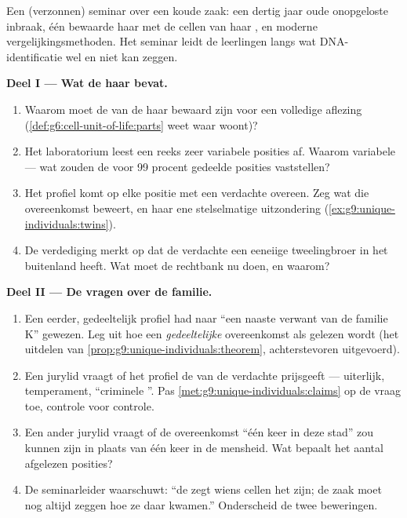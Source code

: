 \begin{problem}\label{pb:g9:unique-individuals:1}
Een (verzonnen) seminar over een koude zaak: een dertig jaar oude
onopgeloste inbraak, één bewaarde haar met de cellen van haar
, en moderne vergelijkingsmethoden. Het seminar leidt de
leerlingen langs wat DNA-identificatie wel en niet kan zeggen.

\medskip\noindent\textbf{Deel I --- Wat de haar
bevat.}
\begin{enumerate}
  \item Waarom moet de \emph{} van de haar bewaard zijn
        voor een volledige aflezing
        (\cref{def:g6:cell-unit-of-life:parts} weet waar 
        woont)?
  \item Het laboratorium leest een reeks zeer variabele posities
        af. Waarom variabele --- wat zouden de voor 99 procent
        gedeelde posities vaststellen?
  \item Het profiel komt op elke positie met een verdachte
        overeen. Zeg wat die overeenkomst beweert, en haar ene
        stelselmatige uitzondering
        (\cref{ex:g9:unique-individuals:twins}).
  \item De verdediging merkt op dat de verdachte een eeneiige
        tweelingbroer in het buitenland heeft. Wat moet de
        rechtbank nu doen, en waarom?
\end{enumerate}

\medskip\noindent\textbf{Deel II --- De vragen over de
familie.}
\begin{enumerate}[resume]
  \item Een eerder, gedeeltelijk profiel had naar ``een naaste
        verwant van de familie K'' gewezen. Leg uit hoe een
        \emph{gedeeltelijke} overeenkomst als 
        gelezen wordt (het uitdelen van
        \cref{prop:g9:unique-individuals:theorem}, achterstevoren
        uitgevoerd).
  \item Een jurylid vraagt of het profiel de  van de
        verdachte prijsgeeft --- uiterlijk, temperament,
        ``criminele ''. Pas
        \cref{met:g9:unique-individuals:claims} op de vraag toe,
        controle voor controle.
  \item Een ander jurylid vraagt of de overeenkomst ``één keer in
        deze stad'' zou kunnen zijn in plaats van één keer in de
        mensheid. Wat bepaalt het aantal afgelezen posities?
  \item De seminarleider waarschuwt: ``de  zegt wiens
        cellen het zijn; de zaak moet nog altijd zeggen hoe ze
        daar kwamen.'' Onderscheid de twee beweringen.
\end{enumerate}


\end{problem}
